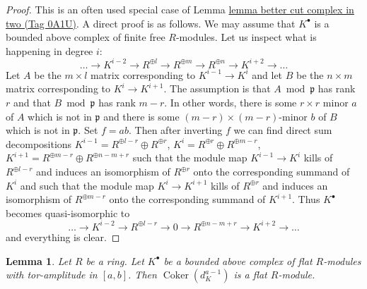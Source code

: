 \documentclass{amsart}
\theoremstyle{plain}
\newtheorem{lemma}[subsection]{Lemma}
\theoremstyle{definition}
\theoremstyle{remark}
\numberwithin{equation}{subsection}
\def\Coker{\mathop{\mathrm{Coker}}}
\begin{document}
\begin{proof}
This is an often used special case of
Lemma \href{https://stacks.math.columbia.edu/tag/0A1U}{lemma better cut complex in two (Tag 0A1U)}.
A direct proof is as follows.
We may assume that $K^\bullet$ is a bounded above
complex of finite free $R$-modules. Let us inspect what is happening
in degree $i$:
$$
\ldots \to K^{i - 2} \to R^{\oplus l}
\to R^{\oplus m} \to R^{\oplus n} \to K^{i + 2} \to \ldots
$$
Let $A$ be the $m \times l$ matrix corresponding to $K^{i - 1} \to K^i$
and let $B$ be the $n \times m$ matrix corresponding to $K^i \to K^{i + 1}$.
The assumption is that $A \bmod \mathfrak p$ has rank $r$ and that
$B \bmod \mathfrak p$ has rank $m - r$. In other words, there is some
$r \times r$ minor $a$ of $A$ which is not in $\mathfrak p$ and there is
some $(m - r) \times (m - r)$-minor $b$ of $B$ which is not in $\mathfrak p$.
Set $f = ab$. Then after inverting $f$ we can find direct sum decompositions
$K^{i - 1} = R^{\oplus l - r} \oplus R^{\oplus r}$,
$K^i = R^{\oplus r} \oplus R^{\oplus m - r}$,
$K^{i + 1} = R^{\oplus m - r} \oplus R^{\oplus n - m + r}$
such that the module map $K^{i - 1} \to K^i$ kills of
$R^{\oplus l - r}$ and induces an isomorphism of $R^{\oplus r}$ onto the
corresponding summand of $K^i$ and such that the module map $K^i \to K^{i + 1}$
kills of $R^{\oplus r}$ and induces an isomorphism of $R^{\oplus m - r}$
onto the corresponding summand of $K^{i + 1}$. Thus $K^\bullet$ becomes
quasi-isomorphic to
$$
\ldots \to K^{i - 2} \to R^{\oplus l - r}
\to 0 \to R^{\oplus n - m + r} \to K^{i + 2} \to \ldots
$$
and everything is clear.
\end{proof}


\begin{lemma}
\label{more-algebra-lemma-last-one-flat}
Let $R$ be a ring. Let $K^\bullet$ be a bounded above complex of
flat $R$-modules with tor-amplitude in $[a, b]$.
Then $\Coker(d_K^{a - 1})$ is a flat $R$-module.
\end{lemma}
\end{document}
